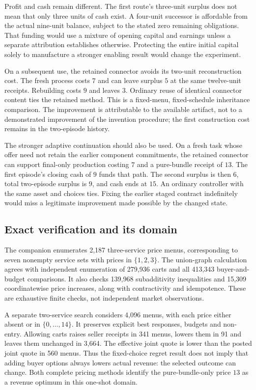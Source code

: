 Profit and cash remain different. The first route's three-unit surplus does not mean that only three units of cash exist. A four-unit successor is affordable from the actual nine-unit balance, subject to the stated zero remaining obligations. That funding would use a mixture of opening capital and earnings unless a separate attribution establishes otherwise. Protecting the entire initial capital solely to manufacture a stronger enabling result would change the experiment.

On a subsequent use, the retained connector avoids its two-unit reconstruction cost. The fresh process costs $7$ and can leave surplus $5$ at the same twelve-unit receipts. Rebuilding costs $9$ and leaves $3$. Ordinary reuse of identical connector content ties the retained method. This is a fixed-menu, fixed-schedule inheritance comparison. The improvement is attributable to the available artifact, not to a demonstrated improvement of the invention procedure; the first construction cost remains in the two-episode history.

The stronger adaptive continuation should also be used. On a fresh task whose offer need not retain the earlier component commitments, the retained connector can support final-only production costing $7$ and a pure-bundle receipt of $13$. The first episode's closing cash of $9$ funds that path. The second surplus is then $6$, total two-episode surplus is $9$, and cash ends at $15$. An ordinary controller with the same asset and choices ties. Fixing the earlier staged contract indefinitely would miss a legitimate improvement made possible by the changed state.

\subsection{Exact verification and its domain}
The companion enumerates 2,187 three-service price menus, corresponding to seven nonempty service sets with prices in $\{1,2,3\}$. The union-graph calculation agrees with independent enumeration of 279,936 carts and all 413,343 buyer-and-budget comparisons. It also checks 139,968 subadditivity inequalities and 15,309 coordinatewise price increases, along with contractivity and idempotence. These are exhaustive finite checks, not independent market observations.

A separate two-service search considers 4,096 menus, with each price either absent or in $\{0,\ldots,14\}$. It preserves explicit best responses, budgets and non-entry. Allowing carts raises seller receipts in 341 menus, lowers them in 91 and leaves them unchanged in 3,664. The effective joint quote is lower than the posted joint quote in 560 menus. Thus the fixed-choice regret result does not imply that adding buyer options always lowers actual revenue: the selected outcome can change. Both complete pricing methods identify the pure-bundle-only price $13$ as a revenue optimum in this one-shot domain.

